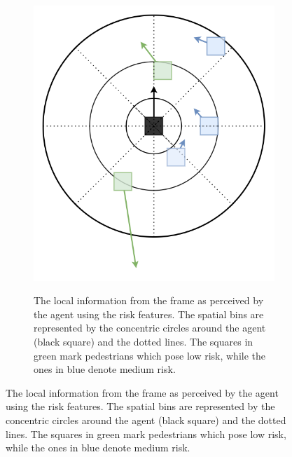 \begin{figure}
\begin{subfigure}[t]{.5\linewidth}
	\end{subfigure}
	\begin{subfigure}[b]{\linewidth}
		\centering
		\includegraphics[width=.4\textwidth]{figures/agent_perspective_recreated.png}
		\label{fig:agent-perspective_agent-perspective}
		\caption{The local information from the frame as perceived by the agent using the risk features. The spatial bins are represented by the concentric circles around the agent (black square) and the dotted lines. The squares in green mark pedestrians which pose low risk, while the ones in blue denote medium risk.}
	\end{subfigure}
\end{figure}

